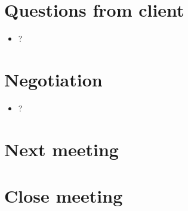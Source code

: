 \documentclass[11pt, a4paper]{article}
\begin{document}
\section{Questions from client}
\begin{itemize}
	\item ?
\end{itemize}

\section{Negotiation}
\begin{itemize}
	\item ?
\end{itemize}

\section{Next meeting}

\section {Close meeting}
\vspace*{10pt}
\end{document}
